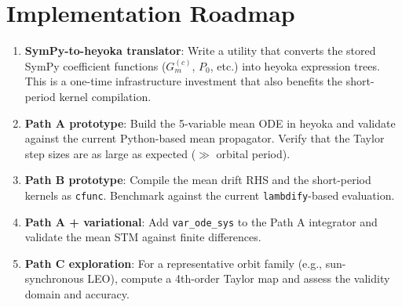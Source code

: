 \documentclass[11pt]{article}
\begin{document}
\section{Implementation Roadmap}

\begin{enumerate}
\item \textbf{SymPy-to-heyoka translator}: Write a utility that converts the
stored SymPy coefficient functions ($G^{(c)}_m$, $P_0$, etc.) into heyoka
expression trees. This is a one-time infrastructure investment that also
benefits the short-period kernel compilation.

\item \textbf{Path A prototype}: Build the 5-variable mean ODE in heyoka
and validate against the current Python-based mean propagator. Verify that
the Taylor step sizes are as large as expected ($\gg$ orbital period).

\item \textbf{Path B prototype}: Compile the mean drift RHS and the
short-period kernels as \texttt{cfunc}. Benchmark against the current
\texttt{lambdify}-based evaluation.

\item \textbf{Path A + variational}: Add \texttt{var\_ode\_sys} to the
Path A integrator and validate the mean STM against finite differences.

\item \textbf{Path C exploration}: For a representative orbit family (e.g.,
sun-synchronous LEO), compute a 4th-order Taylor map and assess the validity
domain and accuracy.
\end{enumerate}
\end{document}
